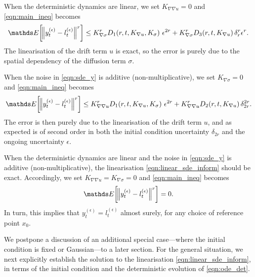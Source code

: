 \begin{remark}\label{rem:bound_linear}
	When the deterministic dynamics are linear, we set \(K_{\nabla\nabla u} = 0\) and \cref{eqn:main_ineq} becomes
	\[
		\avg{\norm{y_t^{(\epsilon)} - l_t^{(\epsilon)}}^r} \leq   K_{\nabla\sigma}^r D_1\!\left(r, t, K_{\nabla u}, K_\sigma\right)\, \epsilon^{2r} + K_{\nabla\sigma}^r D_3\!\left(r,t, K_{\nabla u}\right)\delta_r^r \epsilon^r.
	\]
	The linearisation of the drift term \(u\) is exact, so the error is purely due to the spatial dependency of the diffusion term \(\sigma\).
\end{remark}

\begin{remark}\label{rem:bound_additive}
	When the noise in \cref{eqn:sde_y} is additive (non-multiplicative), we set \(K_{\nabla\sigma} = 0\) and \cref{eqn:main_ineq} becomes
	\[
		\avg{\norm{y_t^{(\epsilon)} - l_t^{(\epsilon)}}^r} \leq   K_{\nabla\nabla u}^r D_1\!\left(r,t, K_{\nabla u}, K_\sigma\right)\, \epsilon^{2r} + K_{\nabla\nabla u}^r D_2\!\left(r,t, K_{\nabla u}\right)\delta_{2r}^{2r}.
	\]
	The error is then purely due to the linearisation of the drift term \(u\), and as expected is of second order in both the initial condition uncertainty \(\delta_{2r}\) and the ongoing uncertainty \(\epsilon\).
\end{remark}

\begin{remark}\label{rem:bound_exact}
	When the deterministic dynamics are linear and the noise in \cref{eqn:sde_y} is additive (non-multiplicative), the linearisation \cref{eqn:linear_sde_inform} should be exact.
	Accordingly, we set \(K_{\nabla\nabla u} = K_{\nabla\sigma} = 0\) and \cref{eqn:main_ineq} becomes
	\[
		\avg{\norm{y_t^{(\epsilon)} - l_t^{(\epsilon)}}^r} = 0.
	\]
	In turn, this implies that \(y_t^{(\epsilon)} = l_t^{(\epsilon)}\) almost surely, for any choice of reference point \(x_0\).
\end{remark}


We postpone a discussion of an additional special case---where the initial condition is fixed or
Gaussian---to a later section.  For the general situation,
we next explicitly establish the solution to the linearisation \cref{eqn:linear_sde_inform}, in terms of the initial condition and the deterministic evolution of \cref{eqn:ode_det}.

